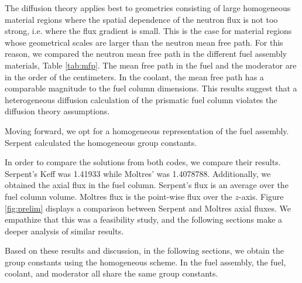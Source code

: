 \documentclass[11pt,letterpaper]{article}
\begin{document}
The diffusion theory applies best to geometries consisting of large homogeneous material regions where the spatial dependence of the neutron flux is not too strong, i.e. where the flux gradient is small.
This is the case for material regions whose geometrical scales are larger than the neutron mean free path.
For this reason, we compared the neutron mean free path in the different fuel assembly materials, Table \ref{tab:mfp}.
The mean free path in the fuel and the moderator are in the order of the centimeters.
In the coolant, the mean free path has a comparable magnitude to the fuel column dimensions.
This results suggest that a heterogeneous diffusion calculation of the prismatic fuel column violates the diffusion theory assumptions.

Moving forward, we opt for a homogeneous representation of the fuel assembly.
Serpent calculated the homogeneous group constants.


In order to compare the solutions from both codes, we compare their results.
Serpent's \gls{Keff} was 1.41933 while Moltres' was 1.4078788.
Additionally, we obtained the axial flux in the fuel column.
Serpent's flux is an average over the fuel column volume.
Moltres flux is the point-wise flux over the $z$-axis.
Figure \ref{fig:prelim} displays a comparison between Serpent and Moltres axial fluxes.
We empathize that this was a feasibility study, and the following sections make a deeper analysis of similar results.


Based on these results and discussion, in the following sections, we obtain the group constants using the homogeneous scheme.
In the fuel assembly, the fuel, coolant, and moderator all share the same group constants.

\end{document}
